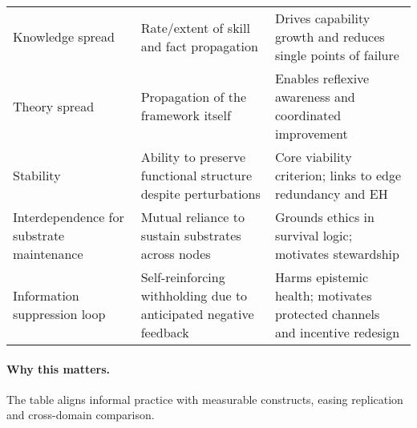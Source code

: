 \documentclass[12pt]{article}
\begin{document}
\begin{table}[htbp]
\begin{tabularx}{\linewidth}{lYY}
Knowledge spread & Rate/extent of skill and fact propagation & Drives capability growth and reduces single points of failure \\
Theory spread & Propagation of the framework itself & Enables reflexive awareness and coordinated improvement \\
Stability & Ability to preserve functional structure despite perturbations & Core viability criterion; links to edge redundancy and EH \\
Interdependence for substrate maintenance & Mutual reliance to sustain substrates across nodes & Grounds ethics in survival logic; motivates stewardship \\
Information suppression loop & Self-reinforcing withholding due to anticipated negative feedback & Harms epistemic health; motivates protected channels and incentive redesign \\
\bottomrule
\end{tabularx}
\end{table}

\paragraph{Why this matters.} The table aligns informal practice with measurable constructs, easing replication and cross-domain comparison.
\end{document}
